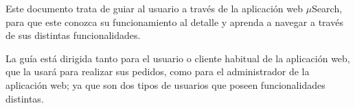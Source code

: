 Este documento trata de guiar al usuario a través de la aplicación web $\mu$Search, para que este conozca su funcionamiento al detalle y aprenda a navegar a través de sus distintas funcionalidades.

La guía está dirigida tanto para el usuario o cliente habitual de la aplicación web, que la usará para realizar sus pedidos, como para el administrador de la aplicación web; ya que son dos tipos de usuarios que poseen funcionalidades distintas.
